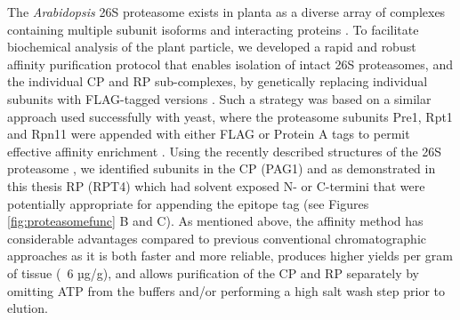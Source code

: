 The \textit{Arabidopsis} 26S proteasome exists in planta as a diverse array of complexes containing multiple subunit isoforms and interacting proteins \citep{book10, fu99, yang04}.  To facilitate biochemical analysis of the plant particle, we developed a rapid and robust affinity purification protocol that enables isolation of intact 26S proteasomes, and the individual CP and RP sub-complexes, by genetically replacing individual subunits with FLAG-tagged versions \citep{book10}.  Such a strategy was based on a similar approach used successfully with yeast, where the proteasome subunits Pre1, Rpt1 and Rpn11 were appended with either FLAG or Protein A tags to permit effective affinity enrichment \citep{leggett05}.  Using the recently described structures of the 26S proteasome \citep{bhattacharyya14, lander12, lasker12}, we identified subunits in the CP (PAG1) and as demonstrated in this thesis RP (RPT4) which had solvent exposed N- or C-termini that were potentially appropriate for appending the epitope tag (see Figures \ref{fig:proteasomefunc} B and C).  
As mentioned above, the affinity method has considerable advantages compared to previous conventional chromatographic approaches \citep{yang04} as it is both faster and more reliable, produces higher yields per gram of tissue (~6 µg/g), and allows purification of the CP and RP separately by omitting ATP from the buffers and/or performing a high salt wash step prior to elution.  
